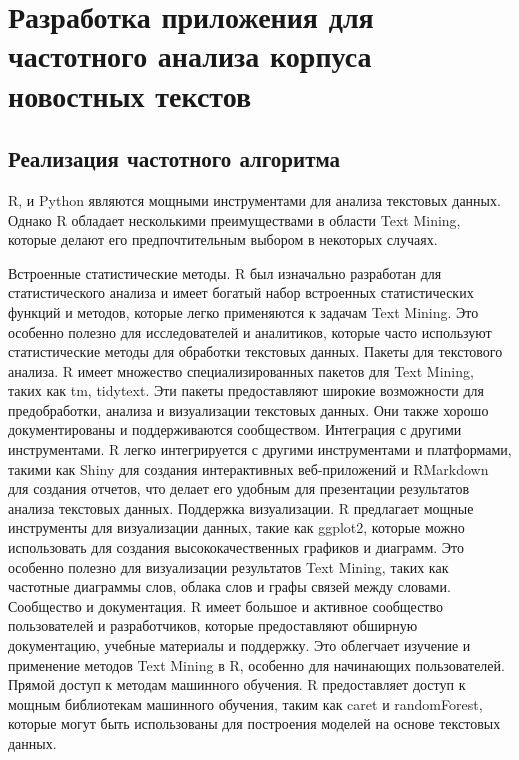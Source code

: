 \documentclass[bachelor, och, coursework ]{SCWorks}
\begin{document}






\section{Разработка приложения для частотного анализа корпуса новостных текстов}
\subsection{Реализация частотного алгоритма}

R, и Python являются мощными инструментами для анализа текстовых данных. Однако R обладает несколькими преимуществами в области Text Mining, которые делают его предпочтительным выбором в некоторых случаях.

Встроенные статистические методы.
R был изначально разработан для статистического анализа и имеет богатый набор встроенных статистических функций и методов, которые легко применяются к задачам Text Mining. Это особенно полезно для исследователей и аналитиков, которые часто используют статистические методы для обработки текстовых данных.
Пакеты для текстового анализа.
R имеет множество специализированных пакетов для Text Mining, таких как tm, tidytext. Эти пакеты предоставляют широкие возможности для предобработки, анализа и визуализации текстовых данных. Они также хорошо документированы и поддерживаются сообществом.
Интеграция с другими инструментами.
R легко интегрируется с другими инструментами и платформами, такими как Shiny для создания интерактивных веб-приложений и RMarkdown для создания отчетов, что делает его удобным для презентации результатов анализа текстовых данных.
 Поддержка визуализации.
R предлагает мощные инструменты для визуализации данных, такие как ggplot2, которые можно использовать для создания высококачественных графиков и диаграмм. Это особенно полезно для визуализации результатов Text Mining, таких как частотные диаграммы слов, облака слов и графы связей между словами.
Сообщество и документация.
R имеет большое и активное сообщество пользователей и разработчиков, которые предоставляют обширную документацию, учебные материалы и поддержку. Это облегчает изучение и применение методов Text Mining в R, особенно для начинающих пользователей.
 Прямой доступ к методам машинного обучения.
R предоставляет доступ к мощным библиотекам машинного обучения, таким как caret и randomForest, которые могут быть использованы для построения моделей на основе текстовых данных. 
\end{document}

